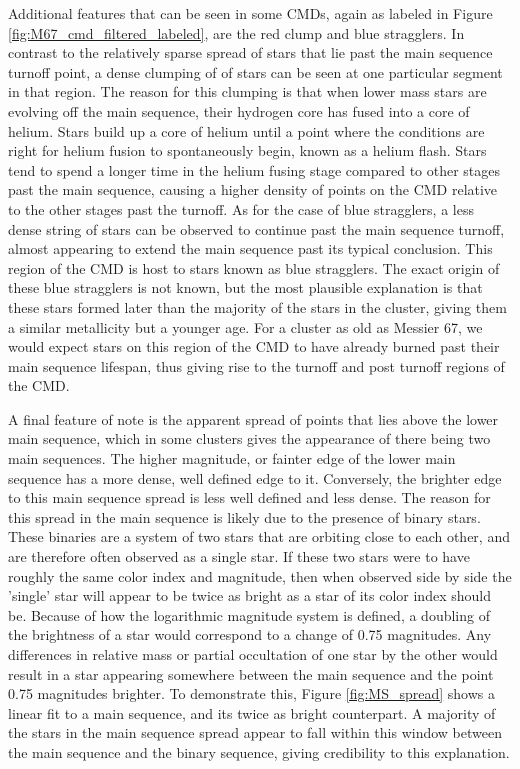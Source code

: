 \documentclass[onecolumn,table,xcdraw,super]{aastex631}
\begin{document}
Additional features that can be seen in some CMDs, again as labeled in Figure \ref{fig:M67_cmd_filtered_labeled}, are the red clump and blue stragglers. In contrast to the relatively sparse spread of stars that lie past the main sequence turnoff point, a dense clumping of of stars can be seen at one particular segment in that region. The reason for this clumping is that when lower mass stars are evolving off the main sequence, their hydrogen core has fused into a core of helium. Stars build up a core of helium until a point where the conditions are right for helium fusion to spontaneously begin, known as a helium flash. Stars tend to spend a longer time in the helium fusing stage compared to other stages past the main sequence, causing a higher density of points on the CMD relative to the other stages past the turnoff. As for the case of blue stragglers, a less dense string of stars can be observed to continue past the main sequence turnoff, almost appearing to extend the main sequence past its typical conclusion. This region of the CMD is host to stars known as blue stragglers. The exact origin of these blue stragglers is not known, but the most plausible explanation is that these stars formed later than the majority of the stars in the cluster, giving them a similar metallicity but a younger age. For a cluster as old as Messier 67, we would expect stars on this region of the CMD to have already burned past their main sequence lifespan, thus giving rise to the turnoff and post turnoff regions of the CMD.

A final feature of note is the apparent spread of points that lies above the lower main sequence, which in some clusters gives the appearance of there being two main sequences. The higher magnitude, or fainter edge of the lower main sequence has a more dense, well defined edge to it. Conversely, the brighter edge to this main sequence spread is less well defined and less dense. The reason for this spread in the main sequence is likely due to the presence of binary stars. These binaries are a system of two stars that are orbiting close to each other, and are therefore often observed as a single star. If these two stars were to have roughly the same color index and magnitude, then when observed side by side the 'single' star will appear to be twice as bright as a star of its color index should be. Because of how the logarithmic magnitude system is defined, a doubling of the brightness of a star would correspond to a change of 0.75 magnitudes. Any differences in relative mass or partial occultation of one star by the other would result in a star appearing somewhere between the main sequence and the point 0.75 magnitudes brighter. To demonstrate this, Figure \ref{fig:MS_spread} shows a linear fit to a main sequence, and its twice as bright counterpart. A majority of the stars in the main sequence spread appear to fall within this window between the main sequence and the binary sequence, giving credibility to this explanation.
\end{document}
